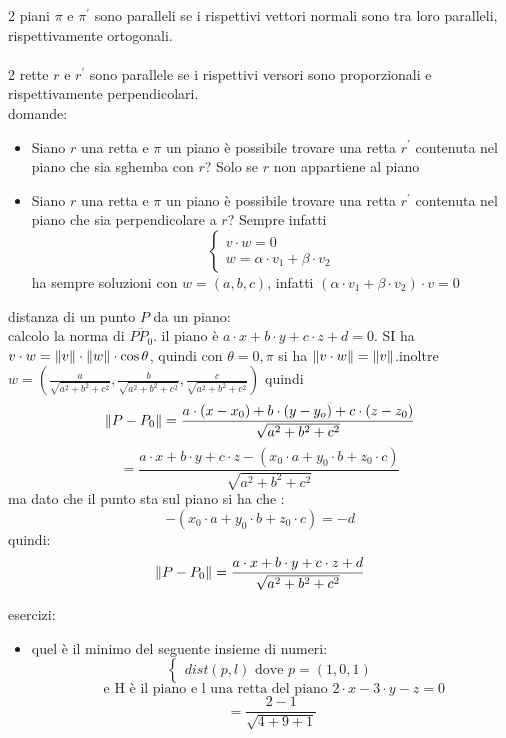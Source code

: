 \documentclass[a4paper,12pt, oneside]{book}
\begin{document}
2 piani $\pi$ e $\pi^{'}$ sono paralleli se i rispettivi vettori normali sono tra loro paralleli, rispettivamente ortogonali.\\
\\
2 rette $r$ e $r^{'}$ sono parallele se i rispettivi versori sono proporzionali e rispettivamente perpendicolari.\\
domande:
\begin{itemize}
	\item Siano $r$ una retta  e $\pi$ un piano è possibile trovare una retta $r^{'}$ contenuta  nel piano che sia sghemba con $r$? Solo se $r$ non appartiene al piano

	\item Siano $r$ una retta  e $\pi$ un piano è possibile trovare una retta $r^{'}$ contenuta  nel piano che sia perpendicolare a $r$? Sempre
	      infatti
	      $$\begin{cases}
			      v\cdot w=0 \\
			      w=\alpha\cdot v_1+\beta\cdot v_2
		      \end{cases}
	      $$
	      ha sempre soluzioni con $w=(a,b,c)$, infatti $(\alpha\cdot v_1+\beta\cdot v_2)\cdot v=0$
\end{itemize}
distanza di un punto $P$ da un piano:\\
calcolo la norma di $\overline{PP_0}$. il piano è $a\cdot x+b\cdot y+c\cdot z+d=0$. SI ha $v\cdot w=\left\lVert {v} \right\rVert\cdot \left\lVert {w} \right\rVert\cdot \cos \theta$, quindi con $\theta =0,\pi$ si ha $\left\lVert {v\cdot w} \right\rVert=\left\lVert {v} \right\rVert$.inoltre $w=\left(\frac{a}{\sqrt{a^2+b^2+c^2}},\frac{b}{\sqrt{a^2+b^2+c^2}},\frac{c}{\sqrt{a^2+b^2+c^2}}\right)$
quindi $$
	\left\lVert {P-P_0} \right\rVert=\frac{a\cdot (x-x_0)+b\cdot (y-y_o)+c\cdot (z-z_0)}{\sqrt{a^2+b^2+c^2}}$$
$$=\frac{a\cdot x+b\cdot y+c\cdot z-(x_0\cdot a+y_0\cdot b+z_0\cdot c)}{\sqrt{a^2+b^2+c^2}}$$
ma dato che il punto sta sul piano si ha che :
$$-(x_0\cdot a+y_0\cdot b+z_0\cdot c)=-d$$
quindi:
$$\left\lVert {P-P_0} \right\rVert=\frac{a\cdot x+b\cdot y+c\cdot z+d}{\sqrt{a^2+b^2+c^2}}$$
\begin{shaded}
	esercizi:
	\begin{itemize}
		\item quel è il minimo del seguente insieme di numeri:
		      $$\begin{cases}
				      dist(p,l) \mbox{ dove } p=(1,0,1)\end{cases} $$$$\mbox{ e H è il piano e l una retta del piano } 2\cdot x -3\cdot y-z=0
		      $$
		      $$=\frac{2-1}{\sqrt{4+9+1}}$$
	\end{itemize}
\end{shaded}
\end{document}
